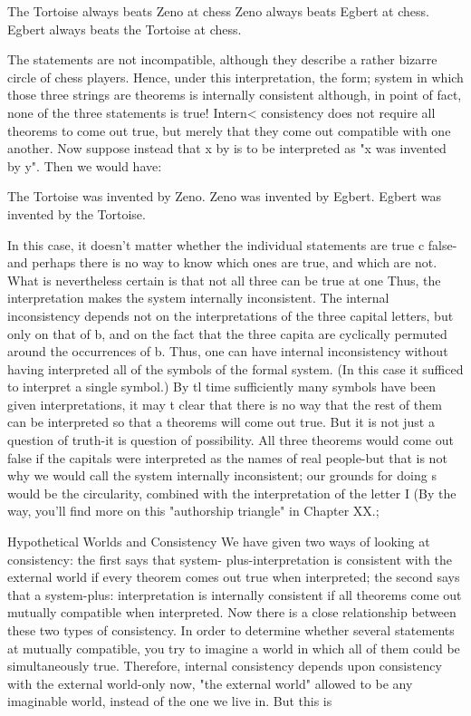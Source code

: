 The Tortoise always beats Zeno at chess Zeno always beats Egbert at chess. Egbert always beats the Tortoise at chess. 

The statements are not incompatible, although they describe a rather bizarre circle of chess players. Hence, under this interpretation, the form; system in which those three strings are theorems is internally consistent although, in point of fact, none of the three statements is true! Intern< consistency does not require all theorems to come out true, but merely that they come out compatible with one another. Now suppose instead that x by is to be interpreted as "x was invented by y". Then we would have: 

The Tortoise was invented by Zeno. Zeno was invented by Egbert. Egbert was invented by the Tortoise. 

In this case, it doesn't matter whether the individual statements are true c false-and perhaps there is no way to know which ones are true, and which are not. What is nevertheless certain is that not all three can be true at one Thus, the interpretation makes the system internally inconsistent. The internal inconsistency depends not on the interpretations of the three capital letters, but only on that of b, and on the fact that the three capita are cyclically permuted around the occurrences of b. Thus, one can have internal inconsistency without having interpreted all of the symbols of the formal system. (In this case it sufficed to interpret a single symbol.) By tl time sufficiently many symbols have been given interpretations, it may t clear that there is no way that the rest of them can be interpreted so that a theorems will come out true. But it is not just a question of truth-it is question of possibility. All three theorems would come out false if the capitals were interpreted as the names of real people-but that is not why we would call the system internally inconsistent; our grounds for doing s would be the circularity, combined with the interpretation of the letter I (By the way, you'll find more on this "authorship triangle" in Chapter XX.; 

Hypothetical Worlds and Consistency We have given two ways of looking at consistency: the first says that system- plus-interpretation is consistent with the external world if every theorem comes out true when interpreted; the second says that a system-plus: interpretation is internally consistent if all theorems come out mutually compatible when interpreted. Now there is a close relationship between these two types of consistency. In order to determine whether several statements at mutually compatible, you try to imagine a world in which all of them could be simultaneously true. Therefore, internal consistency depends upon consistency with the external world-only now, "the external world" allowed to be any imaginable world, instead of the one we live in. But this is 







